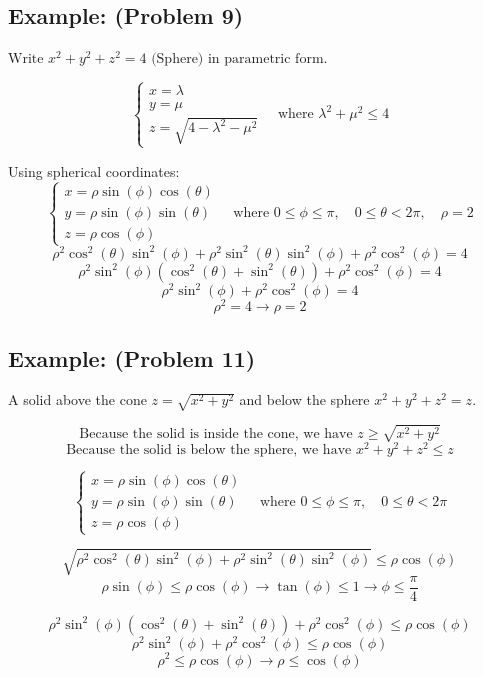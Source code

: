 \documentclass[11pt]{article}
\begin{document}
\subsection*{Example: (Problem 9)}
$\text{Write } x^2 + y^2 + z^2 = 4 \text{ (Sphere)} \text{ in parametric form}$.

\[
\begin{cases}
    x = \lambda \\
    y = \mu \\
    z = \sqrt{4 - \lambda^2 - \mu^2}
\end{cases}
\quad \text{where } \lambda^2 + \mu^2 \leq 4
\]

Using spherical coordinates:
\[
\begin{cases}
    x = \rho \sin(\phi) \cos(\theta) \\
    y = \rho \sin(\phi) \sin(\theta) \\
    z = \rho \cos(\phi)
\end{cases}
\quad \text{where } 0 \leq \phi \leq \pi, \quad 0 \leq \theta < 2\pi, \quad \rho = 2
\]
\[
\rho^2\cos^2(\theta)\sin^2(\phi) + \rho^2\sin^2(\theta)\sin^2(\phi) + \rho^2\cos^2(\phi) = 4
\]
\[
\rho^2\sin^2(\phi)(\cos^2(\theta) + \sin^2(\theta)) + \rho^2\cos^2(\phi) = 4
\]
\[
\rho^2\sin^2(\phi) + \rho^2\cos^2(\phi) = 4
\]
\[
\rho^2 = 4 \rightarrow \rho = 2
\]

\subsection*{Example: (Problem 11)}
A solid above the cone $z = \sqrt{x^2 + y^2}$ and below the sphere $x^2 + y^2 + z^2 = z$.

\[
\text{Because the solid is inside the cone, we have } z \geq \sqrt{x^2 + y^2}
\]
\[
\text{Because the solid is below the sphere, we have } x^2 + y^2 + z^2 \leq z
\]

\[
\begin{cases}
    x = \rho \sin(\phi) \cos(\theta) \\
    y = \rho \sin(\phi) \sin(\theta) \\
    z = \rho \cos(\phi)
\end{cases}
\quad \text{where } 0 \leq \phi \leq \pi, \quad 0 \leq \theta < 2\pi
\]

\[
\sqrt{\rho^2\cos^2(\theta)\sin^2(\phi) + \rho^2\sin^2(\theta)\sin^2(\phi)} \leq \rho\cos(\phi)
\]
\[
\rho\sin(\phi) \leq \rho\cos(\phi) \rightarrow \tan(\phi) \leq 1 \rightarrow \phi \leq \frac{\pi}{4}
\]

\[
\rho^2\sin^2(\phi)(\cos^2(\theta) + \sin^2(\theta)) + \rho^2\cos^2(\phi) \leq \rho\cos(\phi)
\]
\[
\rho^2\sin^2(\phi) + \rho^2\cos^2(\phi) \leq \rho\cos(\phi)
\]
\[  
\rho^2 \leq \rho\cos(\phi) \rightarrow \rho \leq \cos(\phi)
\]
\end{document}
